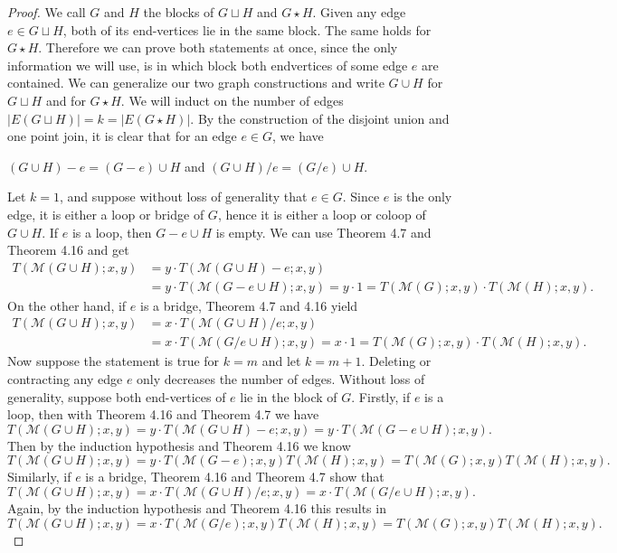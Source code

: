 \documentclass[12pt,a4paper, twoside, autooneside=false]{scrartcl}
\theoremstyle{definition}
\theoremstyle{remark}
\numberwithin{equation}{section}
\newcommand{\M}{\mathcal{M}} %
\begin{document}
\begin{proof}
We call $G$ and $H$ the blocks of $G \sqcup H$ and $G \star H$. Given any edge $e \in G \sqcup H$, both of its end-vertices lie in the same block. The same holds for $G \star H$. Therefore we can prove both statements at once, since the only information we will use, is in which block both endvertices of some edge $e$ are contained. We can generalize our two graph constructions and write $G \cup H$ for $G \sqcup H$ and for $G \star H$. We will induct on the number of edges $|E(G \sqcup H)| = k = |E(G \star H)|$.  By the construction of the disjoint union and one point join, it is clear that for an edge $e \in G$, we have 
\begin{center}
$(G \cup H) - e = (G  - e) \cup H$ and $(G \cup H) / e = (G / e) \cup H$.
\end{center}
Let $k = 1$, and suppose without loss of generality that $e \in G$. Since $e$ is the only edge, it is either a loop or bridge of $G$, hence it is either a loop or coloop of $G \cup H$. If $e$ is a loop, then $G - e \cup H$ is empty. We can use Theorem 4.7 and Theorem 4.16 and get 
\begin{align*}
T(\M(G \cup H);x,y) &= y \cdot T(\M(G \cup H)- e;x,y) \\ &= y \cdot T(\M(G - e \cup H);x,y) = y \cdot 1 = T(\M(G);x,y) \cdot T(\M(H);x,y).
\end{align*}
On the other hand, if $e$ is a bridge, Theorem 4.7 and 4.16 yield
\begin{align*}
T(\M(G \cup H);x,y) &= x \cdot T(\M(G \cup H)/e;x,y) \\ &= x \cdot T(\M(G/ e \cup H);x,y) = x \cdot 1 = T(\M(G);x,y) \cdot T(\M(H);x,y).
\end{align*}
Now suppose the statement is true for $k = m$ and let $k = 
m + 1$. Deleting or contracting any edge $e$ only decreases the number of edges. Without loss of generality, suppose both end-vertices of $e$ lie in the block of $G$. Firstly, if $e$ is a loop, then with Theorem 4.16 and Theorem 4.7 we have
\[
T(\M(G \cup H);x,y) = y \cdot T(\M(G \cup H)-e;x,y) = y \cdot T(\M(G - e \cup H);x,y).
\]
Then by the induction hypothesis and Theorem 4.16 we know
\[
T(\M(G \cup H);x,y) = y \cdot T(\M(G -e);x,y) T(\M(H);x,y) = T(\M(G);x,y)T(\M(H);x,y).
\]
Similarly, if $e$ is a bridge, Theorem 4.16 and Theorem 4.7 show that
\[
T(\M(G \cup H);x,y) = x \cdot T(\M(G \cup H)/e;x,y) = x \cdot T(\M(G/e \cup H);x,y).
\]
Again, by the induction hypothesis and Theorem 4.16 this results in
\[
T(\M(G \cup H);x,y) = x \cdot T(\M(G/e);x,y)T(\M(H);x,y) = T(\M(G);x,y)T(\M(H);x,y).
\]
\end{proof}
\end{document}
